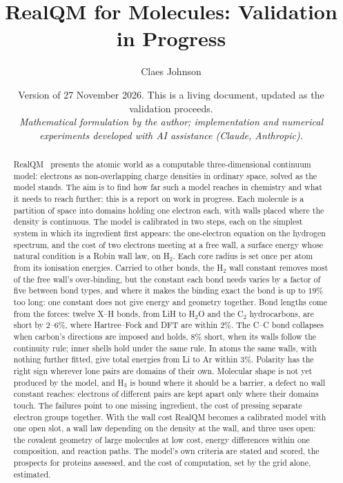 \documentclass[11pt]{article}
\title{RealQM for Molecules: Validation in Progress}
\author[1]{Claes Johnson}
\affil[1]{KTH Royal Institute of Technology, Stockholm, Sweden \\
\texttt{claesjohnson@gmail.com}}
\date{Version of 27 November 2026. This is a living document, updated as the validation proceeds. \\[0.4em]
\small\textit{Mathematical formulation by the author; implementation and numerical} \\
\small\textit{experiments developed with AI assistance (Claude, Anthropic).}}
\begin{document}
\maketitle

\begin{abstract}
RealQM~\cite{realqm} presents the atomic world as a computable three-dimensional continuum model: electrons as
non-overlapping charge densities in ordinary space, solved as the model stands. The aim is to find how far such
a model reaches in chemistry and what it needs to reach further; this is a report on work in progress. Each molecule is a partition of space into domains holding one electron each, with walls placed
where the density is continuous. The model is calibrated in two steps, each on the simplest system in which its
ingredient first appears: the one-electron equation on the hydrogen spectrum, and the cost of two electrons meeting
at a free wall, a surface energy whose natural condition is a Robin wall law, on H$_2$. Each core radius is set
once per atom from its ionisation energies. Carried to other bonds, the H$_2$ wall constant removes most of the
free wall's over-binding, but the constant each bond needs varies by a factor of five between bond types, and
where it makes the binding exact the bond is up to $19\%$ too long: one constant does not give energy and geometry
together. Bond lengths come from the forces: twelve X--H bonds, from LiH to
H$_2$O and the C$_2$ hydrocarbons, are short by $2$--$6\%$, where Hartree--Fock and DFT are within $2\%$. The C--C
bond collapses when carbon's directions are imposed and holds, $8\%$ short, when its walls follow the continuity
rule; inner shells hold under the same rule. In atoms the same walls, with nothing further fitted, give total
energies from Li to Ar within $3\%$. Polarity has the right sign wherever lone pairs are domains of their
own. Molecular shape is not yet produced by the model, and
H$_3$ is bound where it should be a barrier, a defect no wall constant reaches: electrons of different
pairs are kept apart only where their domains touch. The failures point to one missing ingredient, the cost of pressing
separate electron groups together. With the wall cost RealQM becomes a calibrated model with one open slot, a
wall law depending on the density at the wall, and three uses open: the covalent geometry of large molecules at
low cost, energy differences within one composition, and reaction paths. The model's own criteria are stated and
scored, the prospects for proteins assessed, and the cost of computation, set by the grid alone, estimated.
\end{abstract}
\end{document}
